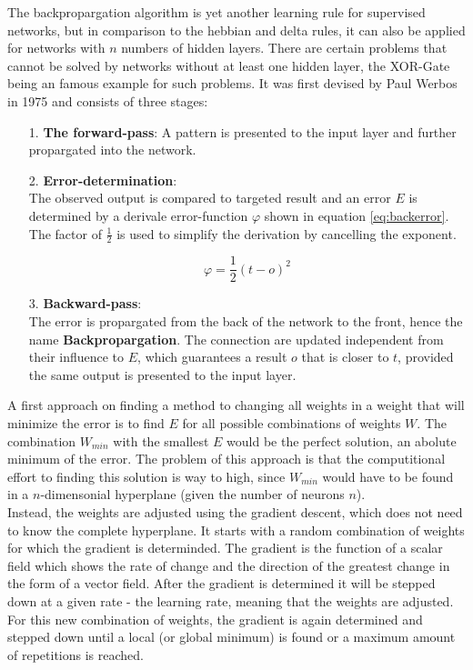 \documentclass[10pt,a4paper,DIV=11]{scrreprt}
\begin{document}
The backpropargation algorithm is yet another learning rule for supervised networks, but in comparison to the hebbian and delta rules, it can also be applied for networks with $n$ numbers of hidden layers. There are certain problems that cannot be solved by networks without at least one hidden layer, the XOR-Gate being an famous example for such problems. It was first devised by Paul Werbos in 1975 \cite{BACK} and consists of three stages:
\begin{itemize}
\item[1.] \textbf{The forward-pass}:
A pattern is presented to the input layer and further propargated into the network.
\item[2.] \textbf{Error-determination}:\\
The observed output is compared to targeted result and an error $E$ is determined by a derivale error-function $\varphi$ shown in equation \eqref{eq:backerror}. The factor of $\frac{1}{2}$ is used to simplify the derivation by cancelling the exponent.

\begin{equation}
\varphi = \frac{1}{2} (t-o)^2
\label{eq:backerror}
\end{equation}
\item[3.] \textbf{Backward-pass}:\\
The error is propargated from the back of the network to the front, hence the name \textbf{Backpropargation}. The connection are updated independent from their influence to $E$, which guarantees a result $o$ that is closer to $t$, provided the same output is presented to the input layer.
\end{itemize}

A first approach on finding a method to changing all weights in a weight that will minimize the error is to find $E$ for all possible combinations of weights $W$. The combination $W_{min}$ with the smallest $E$ would be the perfect solution, an abolute minimum of the error. The problem of this approach is that the computitional effort to finding this solution is way to high, since $W_{min}$ would have to be found in a $n$-dimensonial  hyperplane (given the number of neurons $n$).\\

Instead, the weights are adjusted using the gradient descent, which does not need to know the complete hyperplane. It starts with a random combination of weights for which the gradient is determinded. The gradient is the function of a scalar field which shows the rate of change and the direction of the greatest change in the form of a vector field. After the gradient is determined it will be stepped down at a given rate - the learning rate, meaning that the weights are adjusted. For this new combination of weights, the gradient is again determined and stepped down until a local (or global minimum) is found or a maximum amount of repetitions is reached.\\
\end{document}
